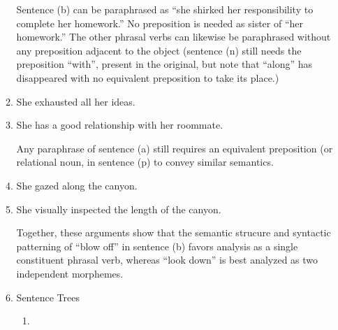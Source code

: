 \documentclass[12pt]{article}
\begin{document}
\begin{enumerate}
\begin{enumerate}
Sentence (b) can be paraphrased as ``she shirked her responsibility to complete her homework.'' No preposition is needed as sister of ``her homework.'' The other phrasal verbs can likewise be paraphrased without any preposition adjacent to the object (sentence (n) still needs the preposition ``with'', present in the original, but note that ``along'' has disappeared with no equivalent preposition to take its place.)
\item She exhausted all her ideas.
\item She has a good relationship with her roommate.

Any paraphrase of sentence (a) still requires an equivalent preposition (or relational noun, in sentence (p) to convey similar semantics.

\item She gazed along the canyon.
\item  She visually inspected the length of the canyon.

Together, these arguments show that the semantic strucure and syntactic patterning of ``blow off'' in sentence (b) favors analysis as a single constituent phrasal verb, whereas ``look down'' is best analyzed as two independent morphemes.

\item Sentence Trees


\begin{enumerate}
\item \leavevmode\vadjust{\vspace{-\baselineskip}}\newline
{}


\end{enumerate}
\end{enumerate}
\end{enumerate}
\end{document}
